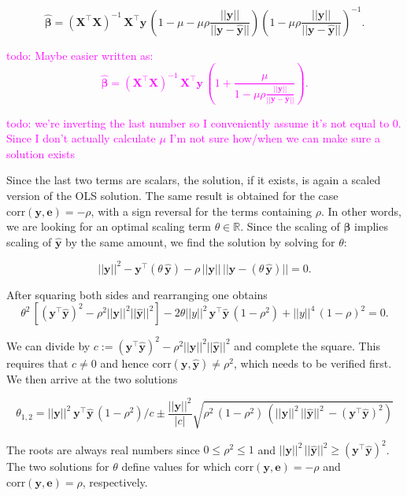 \documentclass[utf8]{frontiersSCNS} %
\newcommand{\todo}[1]{\textcolor{Magenta}{todo: #1}}
\renewcommand{\a}{\theta}
\renewcommand{\b}{\boldsymbol{\beta}} %
\newcommand{\bh}{\boldsymbol{\hat{\beta}}} %
\newcommand{\corr}{\text{corr}}
\newcommand{\e}{\mathbf{e}}
\newcommand{\R}{\mathbb{R}}
\newcommand{\X}{\mathbf{X}}
\newcommand{\y}{\mathbf{y}}
\newcommand{\yh}{\mathbf{\hat{y}}}
\begin{document}
\[
\bh = (\X^\top\X)^{-1} \, \X^\top\y\, (1-\mu-\mu\rho \frac{||\y||}{||\y-\yh||})(1-\mu\rho \frac{||\y||}{||\y-\yh||})^{-1}.
\]

\todo{Maybe easier written as:
\[
\bh = (\X^\top\X)^{-1} \, \X^\top\y\, (1+\frac{\mu}{1-\mu\rho \frac{||\y||}{||\y-\yh||}}).
\]
}


\todo{we're inverting the last number so I conveniently assume it's not equal to 0. Since I don't actually calculate $\mu$ I'm not sure how/when we can make sure a solution exists}

Since the last two terms are scalars, the  solution, if it exists, is again a scaled version of the OLS solution. The same result is obtained for the case $\corr(\y,\e)=-\rho$, with a sign reversal for the terms containing $\rho$. 
In other words, we are looking for an optimal scaling term $\a\in\R$. Since the scaling of $\b$ implies scaling of $\yh$ by the same amount, we find the solution by solving   for $\a$:

\begin{equation*}
||\y||^2-\y^\top (\a\,\yh) - \rho\, ||\y||\,||\y-(\a\,\yh)|| = 0.
\end{equation*}

After squaring both sides and rearranging one obtains 
\begin{equation*}
\a^2 \,[(\y^\top\yh)^2 - \rho^2 ||\y||^2 ||\yh||^2] - 2\a ||y||^2\,\y^\top\yh \,(1-\rho^2) + ||y||^4 \,(1-\rho)^2 = 0.
\end{equation*}

We can divide by $c:=(\y^\top\yh)^2 - \rho^2 ||\y||^2 ||\yh||^2$ and complete the square. This requires that $c\neq  0$ and hence $\corr(\y,\yh)\neq\rho^2$, which needs to be verified first. We then arrive at the two solutions 

\begin{equation*}
\a_{1,2} = ||\y||^2\ \y^\top\yh\,(1-\rho^2)/c \pm \frac{||\y||^2}{|c|}\sqrt{\rho^2\,(1-\rho^2)\,(||\y||^2\,||\yh||^2\,-(\y^\top\yh)^2)}
\end{equation*}

The roots are always real numbers since $0\le\rho^2\le1$ and $||\y||^2\,||\yh||^2\ge(\y^\top\yh)^2$.
 The two solutions for $\a$ define values for which $\corr(\y,\e)=-\rho$ and $\corr(\y,\e)=\rho$, respectively. 
\end{document}
